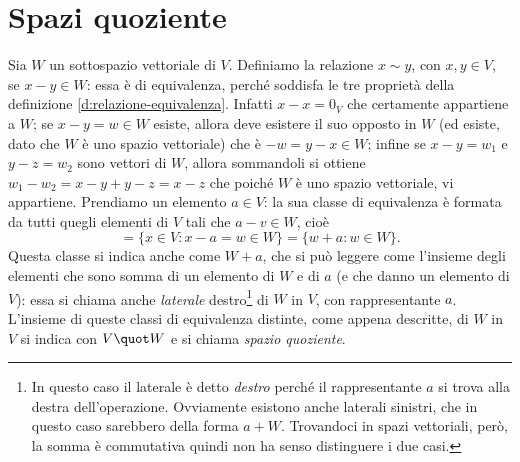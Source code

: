\section{Spazi quoziente} \label{sec:spazi_quoziente}
Sia $W$ un sottospazio vettoriale di $V$.
Definiamo la relazione $  x\sim   y$, con $x,y\in V$, se $  x-  y\in W$: essa è di equivalenza, perché soddisfa le tre proprietà della definizione \ref{d:relazione-equivalenza}.
Infatti $  x-  x=0_V$ che certamente appartiene a $W$; se $  x-  y=  w\in W$ esiste, allora deve esistere il suo opposto in $W$ (ed esiste, dato che $W$ è uno spazio vettoriale) che è $-  w=  y-  x\in W$; infine se $  x-  y=  w_1$ e $  y-  z=  w_2$ sono vettori di $W$, allora sommandoli si ottiene $  w_1-  w_2=  x-  y+  y-  z=  x-  z$ che poiché $W$ è uno spazio vettoriale, vi appartiene.
Prendiamo un elemento $  a\in V$: la sua classe di equivalenza è formata da tutti quegli elementi di $V$ tali che $  a-  v\in W$, cioè
\begin{equation*}
	[  a]=\{  x\in V\colon  x-  a=  w\in W\}=\{  w+  a\colon  w\in W\}.
\end{equation*}
Questa classe si indica anche come $W+  a$, che si può leggere come l'insieme degli elementi che sono somma di un elemento di $W$ e di $  a$ (e che danno un elemento di $V$): essa si chiama anche \emph{laterale} destro\footnote{In questo caso il laterale è detto \emph{destro} perché il rappresentante $  a$ si trova alla destra dell'operazione. Ovviamente esistono anche laterali sinistri, che in questo caso sarebbero della forma $  a+W$. Trovandoci in spazi vettoriali, però, la somma è commutativa quindi non ha senso distinguere i due casi.} di $W$ in $V$, con rappresentante $  a$.
L'insieme di queste classi di equivalenza distinte, come appena descritte, di $W$ in $V$ si indica con $V\quot W$ e si chiama \emph{spazio quoziente}.


